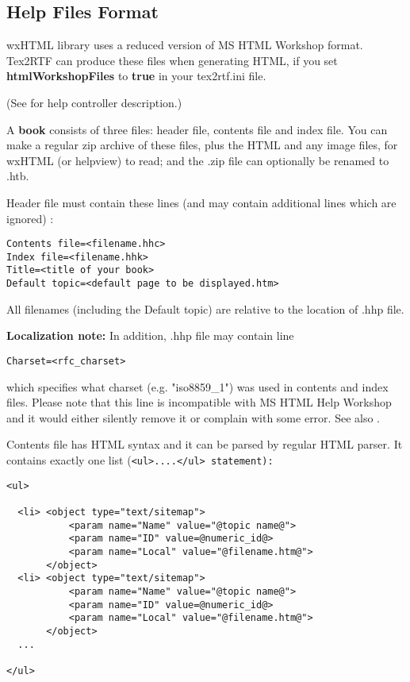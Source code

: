 \subsection{Help Files Format}\label{helpformat}

wxHTML library uses a reduced version of MS HTML Workshop format.
Tex2RTF can produce these files when generating HTML, if you set {\bf htmlWorkshopFiles} to {\bf true} in
your tex2rtf.ini file.

(See  for help controller description.)

A {\bf book} consists of three files: header file, contents file and index file.
You can make a regular zip archive of these files, plus the HTML and any image files,
for wxHTML (or helpview) to read; and the .zip file can optionally be renamed to .htb.


Header file must contain these lines (and may contain additional lines which are ignored) :

\begin{verbatim}
Contents file=<filename.hhc>
Index file=<filename.hhk>
Title=<title of your book>
Default topic=<default page to be displayed.htm>
\end{verbatim}

All filenames (including the Default topic) are relative to the 
location of .hhp file.

{\bf Localization note:} In addition, .hhp file may contain line

\begin{verbatim}
Charset=<rfc_charset>
\end{verbatim}

which specifies what charset (e.g. "iso8859\_1") was used in contents
and index files. Please note that this line is incompatible with
MS HTML Help Workshop and it would either silently remove it or complain
with some error. See also 
.


Contents file has HTML syntax and it can be parsed by regular HTML parser. It contains exactly one list
(\tt{<ul>}....\tt{</ul>} statement):

\begin{verbatim}
<ul>

  <li> <object type="text/sitemap">
           <param name="Name" value="@topic name@">
           <param name="ID" value=@numeric_id@>
           <param name="Local" value="@filename.htm@">
       </object>
  <li> <object type="text/sitemap">
           <param name="Name" value="@topic name@">
           <param name="ID" value=@numeric_id@>
           <param name="Local" value="@filename.htm@">
       </object>
  ...    

</ul>
\end{verbatim}

